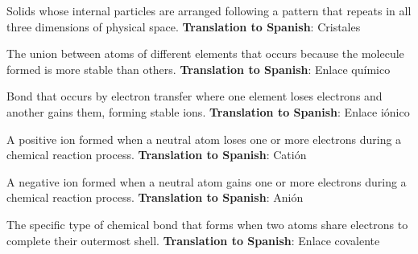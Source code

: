 \begin{vocabulary}[Crystals]
    Solids whose internal particles are arranged following a pattern that repeats in all three dimensions of physical space. \newline
    \textbf{Translation to Spanish}: Cristales \newline
\end{vocabulary}

\begin{vocabulary}
    The union between atoms of different elements that occurs because the molecule formed is more stable than others. \newline
    \textbf{Translation to Spanish}: Enlace químico \newline
\end{vocabulary}

\begin{vocabulary}
    Bond that occurs by electron transfer where one element loses electrons and another gains them, forming stable ions. \newline
    \textbf{Translation to Spanish}: Enlace iónico \newline
\end{vocabulary}

\begin{vocabulary}[Cation]
    A positive ion formed when a neutral atom loses one or more electrons during a chemical reaction process. \newline
    \textbf{Translation to Spanish}: Catión \newline
\end{vocabulary}

\begin{vocabulary}[Anion]
    A negative ion formed when a neutral atom gains one or more electrons during a chemical reaction process. \newline
    \textbf{Translation to Spanish}: Anión \newline
\end{vocabulary}

\begin{vocabulary}
    The specific type of chemical bond that forms when two atoms share electrons to complete their outermost shell. \newline
    \textbf{Translation to Spanish}: Enlace covalente \newline
\end{vocabulary}


